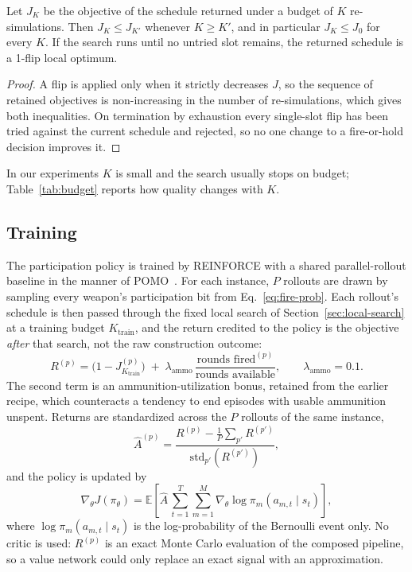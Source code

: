 \begin{proposition}
\label{prop:search-monotone}
Let $J_K$ be the objective of the schedule returned under a budget of $K$
re-simulations. Then $J_{K} \leq J_{K'}$ whenever $K \geq K'$, and in
particular $J_K \leq J_0$ for every $K$. If the search runs until no untried
slot remains, the returned schedule is a 1-flip local optimum.
\end{proposition}
\begin{proof}
A flip is applied only when it strictly decreases $J$, so the sequence of
retained objectives is non-increasing in the number of re-simulations, which
gives both inequalities. On termination by exhaustion every single-slot flip
has been tried against the current schedule and rejected, so no one change to
a fire-or-hold decision improves it.
\end{proof} In our experiments $K$ is small and the search usually stops on budget;
Table~\ref{tab:budget} reports how quality changes with $K$.

\subsection{Training}
\label{sec:training}

The participation policy is trained by REINFORCE with a shared
parallel-rollout baseline in the manner of POMO~\cite{kwon2020pomo}. For each
instance, $P$ rollouts are drawn by sampling every weapon's participation bit
from Eq.~\eqref{eq:fire-prob}. Each rollout's schedule is then passed through
the fixed local search of Section~\ref{sec:local-search} at a training budget
$K_{\text{train}}$, and the return credited to the policy is the objective
\emph{after} that search, not the raw construction outcome:
\begin{equation}
\label{eq:return}
R^{(p)} = \bigl(1 - J_{K_{\text{train}}}^{(p)}\bigr) \;+\; \lambda_{\text{ammo}}\,\frac{\text{rounds fired}^{(p)}}{\text{rounds available}},
\qquad \lambda_{\text{ammo}} = 0.1 .
\end{equation}
The second term is an ammunition-utilization bonus, retained from the earlier
recipe, which counteracts a tendency to end episodes with usable ammunition
unspent. Returns are standardized across the $P$ rollouts of the same
instance,
\begin{equation}
\label{eq:advantage}
\hat{A}^{(p)} = \frac{R^{(p)} - \frac{1}{P}\sum_{p'} R^{(p')}}{\text{std}_{p'}\!\left(R^{(p')}\right)},
\end{equation}
and the policy is updated by
\begin{equation}
\label{eq:actor-gradient}
\nabla_\theta J(\pi_\theta) = \mathbb{E}\!\left[\hat{A}\,\sum_{t=1}^{T}\sum_{m=1}^{M} \nabla_\theta \log \pi_m(a_{m,t}\mid s_t)\right],
\end{equation}
where $\log\pi_m(a_{m,t}\mid s_t)$ is the log-probability of the Bernoulli
event only. No critic is used: $R^{(p)}$ is an exact Monte Carlo evaluation of
the composed pipeline, so a value network could only replace an exact signal
with an approximation.

